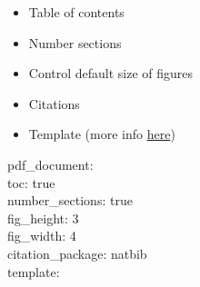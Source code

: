 \documentclass[]{article}
\providecommand{\tightlist}{%
  \setlength{\itemsep}{0pt}\setlength{\parskip}{0pt}}
\begin{document}
\begin{itemize}
\tightlist
\item
  Table of contents
\item
  Number sections
\item
  Control default size of figures
\item
  Citations
\item
  Template (more info
  \href{http://jianghao.wang/post/2017-12-08-rmarkdown-templates/}{here})
\end{itemize}

pdf\_document:\\
toc: true\\
number\_sections: true\\
fig\_height: 3\\
fig\_width: 4\\
citation\_package: natbib\\
template:
\end{document}

